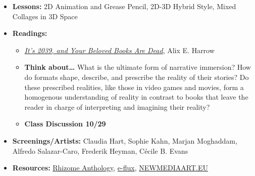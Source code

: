 \def\tues{10/27}%
\def\thur{10/29}%
% 
\begin{itemize}[noitemsep,topsep=0pt,leftmargin=*]
    \item \textbf{Lessons:} 2D Animation and Grease Pencil, 2D-3D Hybrid Style, Mixed Collages in 3D Space
    \item \textbf{Readings:}
          \begin{itemize}
              \item \href{https://www.nytimes.com/2019/12/02/opinion/future-virtual-reality-stories.html}{\emph{It’s 2039, and Your Beloved Books Are Dead}}, Alix E. Harrow
              \item \textbf{Think about\dots} What is the ultimate form of narrative immersion? How do formats shape, describe, and prescribe the reality of their stories? Do these prescribed realities, like those in video games and movies, form a homogenous understanding of reality in contrast to books that leave the reader in charge of interpreting and imagining their reality?
              \item \textbf{Class Discussion \thur}
          \end{itemize}
    \item \textbf{Screenings/Artists:} Claudia Hart, Sophie Kahn, Marjan Moghaddam, Alfredo Salazar-Caro, Frederik Heyman, Cécile B. Evans
    \item \textbf{Resources:} \href{https://anthology.rhizome.org/}{Rhizome Anthology}, \href{https://www.e-flux.com/journal/}{e-flux}, \href{https://www.newmediaart.eu/}{NEWMEDIAART.EU}
\end{itemize}